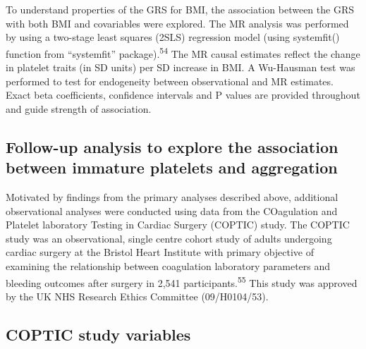 \documentclass[11pt,twoside]{bristolthesis}
\begin{document}
To understand properties of the GRS for BMI, the association between the GRS with both BMI and covariables were explored. The MR analysis was performed by using a two-stage least squares (2SLS) regression model (using systemfit() function from ``systemfit'' package).\textsuperscript{54} The MR causal estimates reflect the change in platelet traits (in SD units) per SD increase in BMI. A Wu-Hausman test was performed to test for endogeneity between observational and MR estimates. Exact beta coefficients, confidence intervals and P values are provided throughout and guide strength of association.

\hypertarget{follow-up-analysis-to-explore-the-association-between-immature-platelets-and-aggregation}{%
\subsection{Follow-up analysis to explore the association between immature platelets and aggregation}\label{follow-up-analysis-to-explore-the-association-between-immature-platelets-and-aggregation}}

Motivated by findings from the primary analyses described above, additional observational analyses were conducted using data from the COagulation and Platelet laboratory Testing in Cardiac Surgery (COPTIC) study. The COPTIC study was an observational, single centre cohort study of adults undergoing cardiac surgery at the Bristol Heart Institute with primary objective of examining the relationship between coagulation laboratory parameters and bleeding outcomes after surgery in 2,541 participants.\textsuperscript{55} This study was approved by the UK NHS Research Ethics Committee (09/H0104/53).

\hypertarget{coptic-study-variables}{%
\subsection{COPTIC study variables}\label{coptic-study-variables}}
\end{document}
